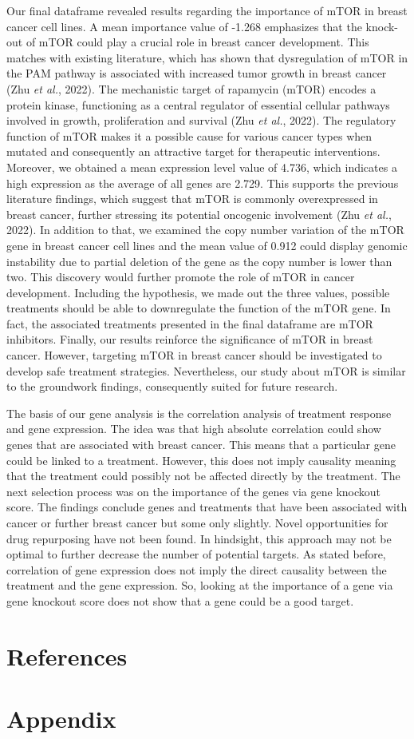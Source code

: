 \documentclass[
  11pt,
]{article}
\begin{document}
Our final dataframe revealed results regarding the importance of mTOR in
breast cancer cell lines. A mean importance value of -1.268 emphasizes
that the knock-out of mTOR could play a crucial role in breast cancer
development. This matches with existing literature, which has shown that
dysregulation of mTOR in the PAM pathway is associated with increased
tumor growth in breast cancer (Zhu \emph{et al.}, 2022). The mechanistic
target of rapamycin (mTOR) encodes a protein kinase, functioning as a
central regulator of essential cellular pathways involved in growth,
proliferation and survival (Zhu \emph{et al.}, 2022). The regulatory
function of mTOR makes it a possible cause for various cancer types when
mutated and consequently an attractive target for therapeutic
interventions. Moreover, we obtained a mean expression level value of
4.736, which indicates a high expression as the average of all genes are
2.729. This supports the previous literature findings, which suggest
that mTOR is commonly overexpressed in breast cancer, further stressing
its potential oncogenic involvement (Zhu \emph{et al.}, 2022). In
addition to that, we examined the copy number variation of the mTOR gene
in breast cancer cell lines and the mean value of 0.912 could display
genomic instability due to partial deletion of the gene as the copy
number is lower than two. This discovery would further promote the role
of mTOR in cancer development. Including the hypothesis, we made out the
three values, possible treatments should be able to downregulate the
function of the mTOR gene. In fact, the associated treatments presented
in the final dataframe are mTOR inhibitors. Finally, our results
reinforce the significance of mTOR in breast cancer. However, targeting
mTOR in breast cancer should be investigated to develop safe treatment
strategies. Nevertheless, our study about mTOR is similar to the
groundwork findings, consequently suited for future research.

The basis of our gene analysis is the correlation analysis of treatment
response and gene expression. The idea was that high absolute
correlation could show genes that are associated with breast cancer.
This means that a particular gene could be linked to a treatment.
However, this does not imply causality meaning that the treatment could
possibly not be affected directly by the treatment. The next selection
process was on the importance of the genes via gene knockout score. The
findings conclude genes and treatments that have been associated with
cancer or further breast cancer but some only slightly. Novel
opportunities for drug repurposing have not been found. In hindsight,
this approach may not be optimal to further decrease the number of
potential targets. As stated before, correlation of gene expression does
not imply the direct causality between the treatment and the gene
expression. So, looking at the importance of a gene via gene knockout
score does not show that a gene could be a good target.

\hypertarget{references}{%
\section{References}\label{references}}

\hypertarget{appendix}{%
\section{Appendix}\label{appendix}}
\end{document}
